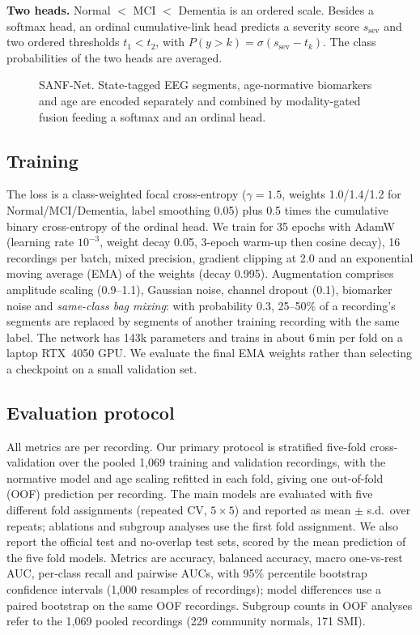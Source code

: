 \documentclass[conference]{IEEEtran}
\begin{document}
\textbf{Two heads.} Normal $<$ MCI $<$ Dementia is an ordered scale. Besides a softmax head, an ordinal
cumulative-link head \cite{mccullagh1980regression} predicts a severity score $s_{\mathrm{sev}}$ and two
ordered thresholds $t_1<t_2$, with $P(y>k)=\sigma(s_{\mathrm{sev}}-t_k)$. The class probabilities of
the two heads are averaged.

\begin{figure}[t]
\centering
\resizebox{\columnwidth}{!}{}
\caption{SANF-Net. State-tagged EEG segments, age-normative biomarkers and age are encoded separately
and combined by modality-gated fusion feeding a softmax and an ordinal head.}
\label{fig:arch}
\end{figure}

\subsection{Training}
The loss is a class-weighted focal cross-entropy \cite{lin2017focal} ($\gamma=1.5$, weights
1.0/1.4/1.2 for Normal/MCI/Dementia, label smoothing 0.05) plus 0.5 times the cumulative binary
cross-entropy of the ordinal head. We train for 35 epochs with AdamW (learning rate $10^{-3}$, weight
decay 0.05, 3-epoch warm-up then cosine decay), 16 recordings per batch, mixed precision, gradient
clipping at 2.0 and an exponential moving average (EMA) of the weights (decay 0.995). Augmentation
comprises amplitude scaling (0.9--1.1), Gaussian noise, channel dropout (0.1), biomarker noise and
\emph{same-class bag mixing}: with probability 0.3, 25--50\% of a recording's segments are replaced by
segments of another training recording with the same label. The network has 143k parameters and
trains in about 6\,min per fold on a laptop RTX~4050 GPU. We evaluate the final EMA weights rather than
selecting a checkpoint on a small validation set.

\subsection{Evaluation protocol}
All metrics are per recording. Our primary protocol is stratified five-fold cross-validation over the
pooled 1,069 training and validation recordings, with the normative model and age scaling refitted in
each fold, giving one out-of-fold (OOF) prediction per recording. The main models are evaluated with
five different fold assignments (repeated CV, $5\times5$) and reported as mean $\pm$ s.d.\ over repeats;
ablations and subgroup analyses use the first fold assignment. We also report the official test and
no-overlap test sets, scored by the mean prediction of the five fold models. Metrics are accuracy,
balanced accuracy, macro one-vs-rest AUC, per-class recall and pairwise AUCs, with 95\% percentile
bootstrap confidence intervals (1,000 resamples of recordings); model differences use a paired
bootstrap on the same OOF recordings. Subgroup counts in OOF analyses refer to the 1,069 pooled
recordings (229 community normals, 171 SMI).
\end{document}
